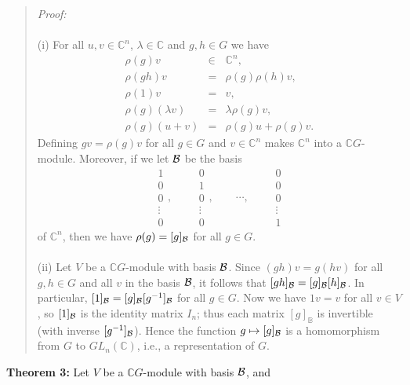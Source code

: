\begin{quote}
\emph{Proof:}
\\
\\
(i) For all $u,v\in {\mathbb C}^n$, $\lambda\in{\mathbb C}$ and
$g,h\in G$ we have
\begin{eqnarray*}
\rho(g)v\!\!\!\!&\in&\!\!\!\!{\mathbb C}^n,\\
\rho(gh)v\!\!\!\!&=&\!\!\!\!\rho(g)\rho(h)v,\\
\rho(1)v\!\!\!\!&=&\!\!\!\!v,\\
\rho(g)(\lambda v)\!\!\!\!&=&\!\!\!\!\lambda\rho(g)v,\\
\rho(g)(u+v)\!\!\!\!&=&\!\!\!\!\rho(g)u+\rho(g)v.
\end{eqnarray*}
Defining $gv=\rho(g)v$ for all $g\in G$ and $v\in {\mathbb C}^n$ makes
${\mathbb C}^n$ into a ${\mathbb C}G$-module. Moreover, if we let ${\cal B}$ be the basis
$$\begin{matrix}1\\0\\0\\\vdots\\0\end{matrix},\qquad
\begin{matrix}0\\1\\0\\\vdots\\0\end{matrix},\qquad\cdots,\qquad
\begin{matrix}0\\0\\0\\\vdots\\1\end{matrix}$$
of ${\mathbb C}^n$, then we have $\rho(g)=[g]_{\cal B}$ for all $g\in G$.
\\
\\
(ii) Let $V$ be a ${\mathbb C}G$-module with basis ${\cal B}$. Since
$(gh)v=g(hv)$ for all $g,h\in G$ and all $v$ in the basis ${\cal B}$, it follows that
$[gh]_{\cal B}=[g]_{\cal B}[h]_{\cal B}$. In particular, 
$[1]_{\cal B}=[g]_{\cal B}[g^{-1}]_{\cal B}$ for all
$g\in G$. Now we have $1v=v$ for all $v\in V$, so $[1]_{\cal B}$ is the identity
matrix $I_n$; thus each matrix $[g]_{\mathbb B}$ is invertible (with inverse
$[g^{-1}]_{\cal B}$). Hence the function $g\mapsto [g]_{\cal B}$ is a homomorphism from
$G$ to $GL_n({\mathbb C})$, i.e., a representation of $G$.
\end{quote}
{\bf Theorem 3:} Let $V$ be a ${\mathbb C}G$-module with basis ${\cal B}$, and
